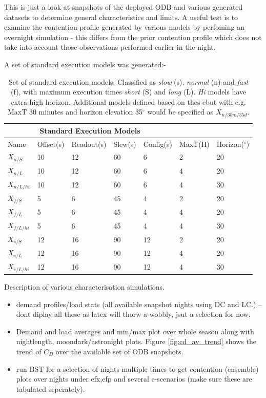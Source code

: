 This is just a look at snapshots of the deployed ODB and various generated datasets to determine general characteristics and limits. A useful test is to examine the contention profile generated by various models by perfoming an overnight simulation - this differs from the prior contention profile which does not take into account those observations performed earlier in the night.

A set of standard execution models was generated:-

\begin{table}[h]
\begin{center}
\begin{tabular}{lllllll}
\toprule
\multicolumn{5}{c}{Standard Execution Models} \\
\midrule
Name & Offset(s) & Readout(s) & Slew(s) & Config(s) & MaxT(H) & Horizon($^{\circ}$) \\
\midrule
$X_{n/S}$      & 10     & 12      & 60   & 6  &  2  & 20 \\
$X_{n/L}$      & 10     & 12      & 60   & 6  &  4  & 20 \\
$X_{n/L/hi}$   & 10     & 12      & 60   & 6  &  4  & 30 \\
$X_{f/S}$      & 5      & 6       & 45   & 4  &  2  & 20 \\
$X_{f/L}$      & 5      & 6       & 45   & 4  &  4  & 20 \\
$X_{f/L/hi}$   & 5      & 6       & 45   & 4  &  4  & 30 \\
$X_{s/S}$      & 12     & 16      & 90   & 12 &  2  & 20 \\ 
$X_{s/L}$      & 12     & 16      & 90   & 12 &  4  & 20 \\ 
$X_{s/L/hi}$   & 12     & 16      & 90   & 12 &  4  & 30 \\ 
\bottomrule
\end{tabular}
\end{center}
\caption{Set of standard execution models. Classified as \emph{slow} (s), \emph{normal} (n) and \emph{fast} (f), with maximum execution times \emph{short} (S) and \emph{long} (L). \emph{Hi} models have extra high horizon. Additional models defined based on thes ebut with e.g. MaxT 30 minutes and horizon elevation 35$^{\circ}$ would be specified as $X_{n/30m/35d}$. }
\end{table}

Description of various characterisation simulations.
\begin{itemize}
\item demand profiles/load stats (all available snapshot nights using DC and LC.) -- dont diplay all these as latex will thorw a wobbly, jsut a selection for now.
\item Demand and load averages and min/max plot over whole season along with nightlength, moondark/astronight plots. Figure \ref{fig:cd_av_trend} shows the trend of $C_D$ over the available set of ODB snapshots.


\item run BST for a selection of nights multiple times to get contention (ensemble) plots over nights under efx,efp and several e-scenarios (make sure these are tabulated seperately).
\end{itemize}

